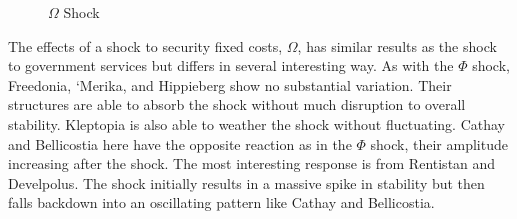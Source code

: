 \documentclass[12pt]{article}
\begin{document}
\begin{spacing}{1.5}
 
\begin{figure}
\centering
{} 
\caption{$\Omega$ Shock}

\end{figure}

The effects of a shock to security fixed costs, $\Omega$, has similar results as the shock to government services but differs in several interesting way. As with the $\Phi$ shock, Freedonia, `Merika, and Hippieberg show no substantial variation. Their structures are able to absorb the shock without much disruption to overall stability. Kleptopia is also able to weather the shock without fluctuating. Cathay and Bellicostia here have the opposite reaction as in the $\Phi$ shock, their amplitude increasing after the shock. The most interesting response is from Rentistan and Develpolus. The shock initially results in a massive spike in stability but then falls backdown into an oscillating pattern like Cathay and Bellicostia. 


\end{spacing}
\end{document}
